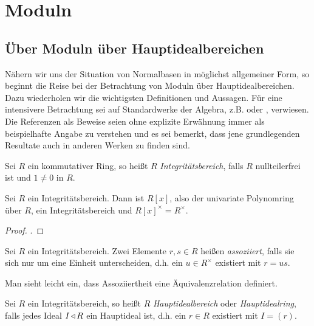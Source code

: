 \chapter{Moduln}
\label{chap:moduln}

\section{Über Moduln über Hauptidealbereichen}
\label{sec:Moduln}

Nähern wir uns der Situation von Normalbasen in möglichst allgemeiner Form, so
beginnt die Reise bei der Betrachtung von Moduln über Hauptidealbereichen. Dazu
wiederholen wir die wichtigsten Definitionen und Aussagen. Für eine intensivere
Betrachtung sei auf Standardwerke der Algebra, z.B. 
\autocite{lang2002algebra} oder \autocite{hartley1974rings}, verwiesen.
Die Referenzen als Beweise seien ohne explizite Erwähnung immer 
als beispielhafte Angabe zu verstehen und es
sei bemerkt, dass jene grundlegenden Resultate auch in anderen Werken zu 
finden sind.

\begin{definition}[Integritätsbereich]
  Sei $R$ ein kommutativer Ring, so heißt $R$ \emph{Integritätsbereich},
  falls $R$ nullteilerfrei ist und $1\neq 0$ in $R$.
\end{definition}

\begin{lemma}
  Sei $R$ ein Integritätsbereich. Dann ist $R[x]$, also der 
  univariate Polynomring über $R$, ein Integritätsbereich und
  $R[x]^\times = R^\times$.
\end{lemma}
\begin{proof}
  \autocite[Lemma 13.4]{karpfinger2010algebra}.
\end{proof}

\begin{definition}
  Sei $R$ ein Integritätsbereich. Zwei Elemente $r,s\in R$ heißen 
  \emph{assoziiert}, falls sie sich nur um eine Einheit unterscheiden, d.h. ein
  $u \in R^\times$ existiert mit $r = us$.
\end{definition}

\begin{bemerkung}
  Man sieht leicht ein, dass Assoziiertheit eine Äquivalenzrelation definiert.
\end{bemerkung}

\begin{definition}[Hauptidealbereich]
  Sei $R$ ein Integritätsbereich, so heißt $R$ \emph{Hauptidealbereich}
  oder \emph{Hauptidealring}, falls jedes Ideal $I\operatorname{\triangleleft} R$ ein
  Hauptideal ist, d.h. ein $r \in R$ existiert mit
  $I = (r)$.
\end{definition}


